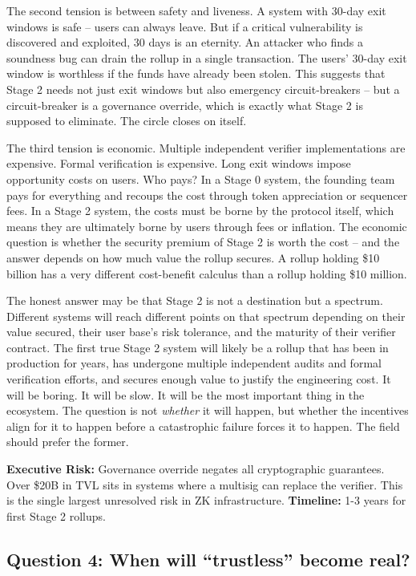 \documentclass[
  11pt,
  openany]{report}
\renewcommand{\textbf}[1]{{\bfseries\color{MidnightBold}#1}}
\begin{document}
The second tension is between safety and liveness. A system with 30-day exit
windows is safe -- users can always leave. But if a critical vulnerability is
discovered and exploited, 30 days is an eternity. An attacker who finds a
soundness bug can drain the rollup in a single transaction. The users' 30-day
exit window is worthless if the funds have already been stolen. This suggests
that Stage 2 needs not just exit windows but also emergency circuit-breakers --
but a circuit-breaker is a governance override, which is exactly what Stage 2 is
supposed to eliminate. The circle closes on itself.

The third tension is economic. Multiple independent verifier implementations are
expensive. Formal verification is expensive. Long exit windows impose
opportunity costs on users. Who pays? In a Stage 0 system, the founding team
pays for everything and recoups the cost through token appreciation or sequencer
fees. In a Stage 2 system, the costs must be borne by the protocol itself, which
means they are ultimately borne by users through fees or inflation. The economic
question is whether the security premium of Stage 2 is worth the cost -- and the
answer depends on how much value the rollup secures. A rollup holding \$10
billion has a very different cost-benefit calculus than a rollup holding \$10
million.

The honest answer may be that Stage 2 is not a destination but a spectrum.
Different systems will reach different points on that spectrum depending on
their value secured, their user base's risk tolerance, and the maturity of their
verifier contract. The first true Stage 2 system will likely be a rollup that
has been in production for years, has undergone multiple independent audits and
formal verification efforts, and secures enough value to justify the engineering
cost. It will be boring. It will be slow. It will be the most important thing in
the ecosystem. The question is not \emph{whether} it will happen, but whether
the incentives align for it to happen before a catastrophic failure forces it to
happen. The field should prefer the former.

\textbf{Executive Risk:} Governance override negates all cryptographic
guarantees. Over \$20B in TVL sits in systems where a multisig can replace the
verifier. This is the single largest unresolved risk in ZK infrastructure.
\textbf{Timeline:} 1-3 years for first Stage 2 rollups.

\subsection{Question 4: When will ``trustless'' become
real?}\label{question-4-when-will-trustless-become-real}
\end{document}
